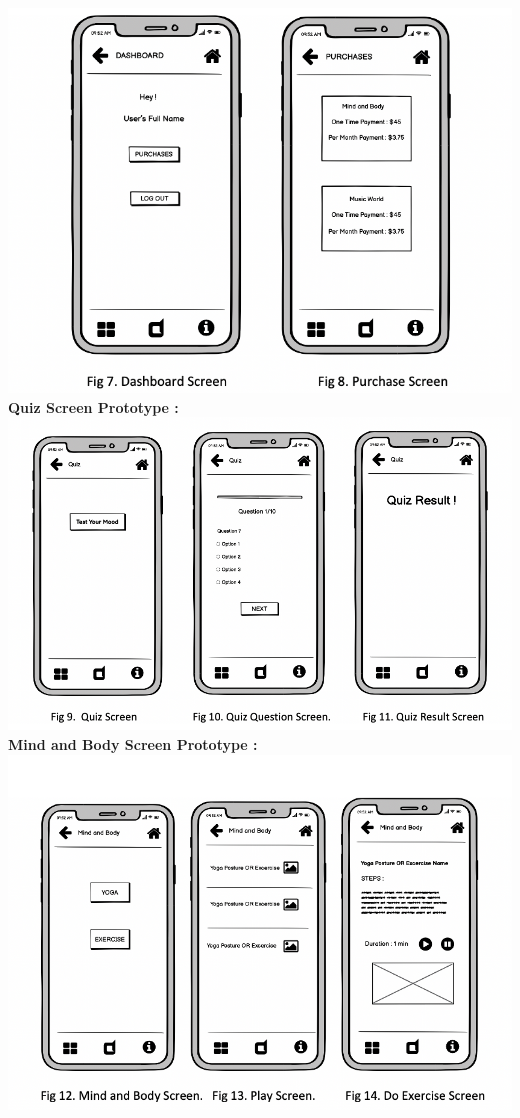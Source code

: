 \includegraphics[scale=0.8]{monetizationwireframe.png}
\newline
\textbf{Quiz Screen Prototype :} 
\newline
\includegraphics[scale=0.8]{quizwireframe.png}
\newpage
\textbf{Mind and Body Screen Prototype :} 
\newline
\includegraphics[scale=0.8]{mindandbodywireframe.png}
